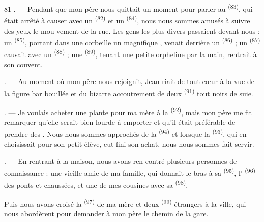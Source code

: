 \begin{VUpage}[83]{81}
. --- Pendant que mon père nous quittait un\nl
moment pour parler au  \textsuperscript{(83)}, qui était\nl
arrêté à causer avec un  \textsuperscript{(82)} et un  \textsuperscript{(84)},\nl
nous nous sommes amusés à suivre des yeux le mou\cc
vement de la rue. Les gens les plus divers passaient\nl
devant nous : un  \textsuperscript{(85)}, portant dans\nl
une corbeille un magnifique , venait derrière un\nl
{} \textsuperscript{(86)} ; un \cc
{} \textsuperscript{(87)} causait avec un  \textsuperscript{(88)} ; une \cc
{} \textsuperscript{(89)}, tenant une petite orpheline par la main,\nl
rentrait à son couvent.

. --- Au moment où mon père nous rejoignit,\nl
Jean riait de tout cœur à la vue de la figure bar\cc
bouillée et du bizarre accoutrement de deux \cc
{} \textsuperscript{(91)} tout noirs de suie.

. --- Je voulais acheter une plante pour ma mère\nl
à la  \textsuperscript{(92)}, mais mon père me\nl
fit remarquer qu'elle serait bien lourde à emporter et\nl
qu'il était préférable de prendre des . Nous\nl
nous sommes approchés de la  \textsuperscript{(94)} et\nl
lorsque la  \textsuperscript{(93)}, qui en choisissait pour\nl
son petit élève, eut fini son achat, nous nous sommes\nl
fait servir.

. --- En rentrant à la maison, nous avons ren\cc
contré plusieurs personnes de connaissance : une\nl
vieille amie de ma famille, qui donnait le bras à sa\nl
{} \textsuperscript{(95)}, l' \textsuperscript{(96)} des ponts\nl
et chaussées, et une de mes cousines avec sa \nl
{} \textsuperscript{(98)}.

\VUblancAlinea
Puis nous avons croisé la  \textsuperscript{(97)} de ma mère\nl
et deux  \textsuperscript{(99)} étrangers à la ville, qui nous\nl
abordèrent pour demander à mon père le chemin de\nl
la gare.

\VUsaut{6.0mm}
\VUfilet{22mm}
\end{VUpage}
